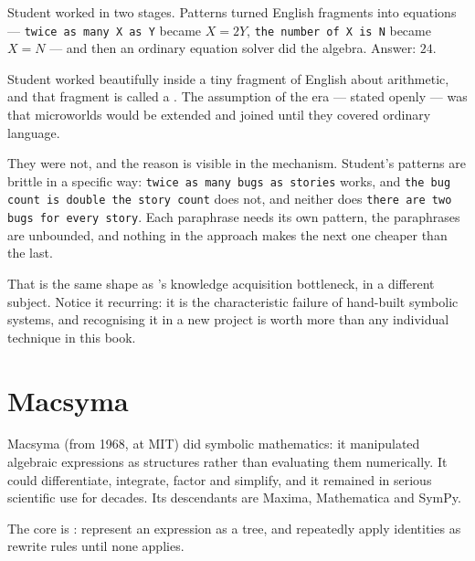 Student worked in two stages. Patterns turned English fragments into equations ---
\texttt{twice as many X as Y} became $X = 2Y$, \texttt{the number of X is N} became
$X = N$ --- and then an ordinary equation solver did the algebra. Answer: $24$.

\begin{alertbox}
Student worked beautifully inside a tiny fragment of English about arithmetic, and
that fragment is called a . The assumption of the era --- stated
openly --- was that microworlds would be extended and joined until they covered
ordinary language.

They were not, and the reason is visible in the mechanism. Student's patterns are
brittle in a specific way: \texttt{twice as many bugs as stories} works, and
\texttt{the bug count is double the story count} does not, and neither does
\texttt{there are two bugs for every story}. Each paraphrase needs its own pattern,
the paraphrases are unbounded, and nothing in the approach makes the next one
cheaper than the last.

That is the same shape as 's knowledge acquisition bottleneck, in a
different subject. Notice it recurring: it is the characteristic failure of
hand-built symbolic systems, and recognising it in a new project is worth more than
any individual technique in this book.
\end{alertbox}

\section{Macsyma}

Macsyma (from 1968, at MIT) did symbolic mathematics: it manipulated algebraic
expressions as structures rather than evaluating them numerically. It could
differentiate, integrate, factor and simplify, and it remained in serious scientific
use for decades. Its descendants are Maxima, Mathematica and SymPy.

The core is : represent an expression as a tree, and repeatedly
apply identities as rewrite rules until none applies.

